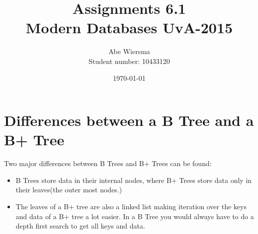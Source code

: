\documentclass{article}
\title{Assignments 6.1\\ \large{Modern Databases UvA-2015}}
\author{Abe Wiersma\\Student number: 10433120}
\date{\today}
\begin{document}
\maketitle

\section*{Differences between a B Tree and a B+ Tree}
Two major differences between B Trees and B+ Trees can be found:
\begin{itemize}
    \item B Trees store data in their internal nodes, where B+ Trees store
    data only in their leaves(the outer most nodes.)
    \item The leaves of a B+ tree are also a linked list making iteration over
    the keys and data of a B+ tree a lot easier. In a B Tree you would always
    have to do a depth first search to get all keys and data.
\end{itemize}
\end{document}
